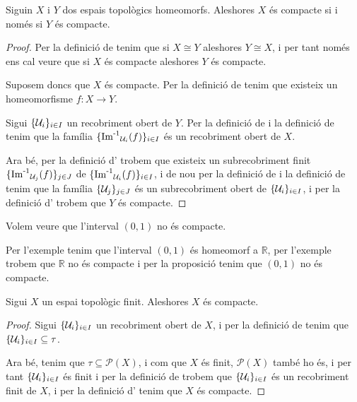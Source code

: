 \documentclass[../Apunts.tex]{subfiles}
\begin{document}
	\begin{proposition}
		\label{prop:la compacitat és una propietat topològica}
		Siguin \(X\) i \(Y\) dos espais topològics homeomorfs. Aleshores \(X\) és compacte si i només si \(Y\) és compacte.
		\begin{proof}
			Per la definició de  tenim que si \(X\cong Y\) aleshores \(Y\cong X\), i per tant només ens cal veure que si \(X\) és compacte aleshores \(Y\) és compacte.
			
			Suposem doncs que \(X\) és compacte. Per la definició de  tenim que existeix un homeomorfisme \(f\colon X\longrightarrow Y\).
			
			Sigui \(\{\mathcal{U}_{i}\}_{i\in I}\) un recobriment obert de \(Y\). Per la definició de  i la definició de  tenim que la família \(\{\operatorname{\operatorname{Im}^{-1}}_{\mathcal{U}_{i}}(f)\}_{i\in I}\) és un recobriment obert de \(X\).
			
			Ara bé, per la definició d' trobem que existeix un subrecobriment finit \(\{\operatorname{\operatorname{Im}^{-1}}_{\mathcal{U}_{j}}(f)\}_{j\in J}\) de \(\{\operatorname{\operatorname{Im}^{-1}}_{\mathcal{U}_{i}}(f)\}_{i\in I}\), i de nou per la definició de  i la definició de  tenim que la família \(\{\mathcal{U}_{j}\}_{j\in J}\) és un subrecobriment obert de \(\{\mathcal{U}_{i}\}_{i\in I}\), i per la definició d' trobem que \(Y\) és compacte.
		\end{proof}
	\end{proposition}
	\begin{example}
		\label{ex:l'interval (0,1) no és compacte}
		Volem veure que l'interval \((0,1)\) no és compacte.
		\begin{solution}
			Per l'exemple  tenim que l'interval \((0,1)\) és homeomorf a \(\mathbb{R}\), per l'exemple  trobem que \(\mathbb{R}\) no és compacte i per la proposició  tenim que \((0,1)\) no és compacte.
		\end{solution}
	\end{example}
	\begin{proposition}
		\label{prop:un espai topològic finit és compacte}
		Sigui \(X\) un espai topològic finit. Aleshores \(X\) és compacte.
		\begin{proof}
			Sigui \(\{\mathcal{U}_{i}\}_{i\in I}\) un recobriment obert de \(X\), i per la definició de  tenim que \(\{\mathcal{U}_{i}\}_{i\in I}\subseteq\tau\).
			
			Ara bé, tenim que \(\tau\subseteq\mathcal{P}(X)\), i com que \(X\) és finit, \(\mathcal{P}(X)\) també ho és, i per tant \(\{\mathcal{U}_{i}\}_{i\in I}\) és finit i per la definició de  trobem que \(\{\mathcal{U}_{i}\}_{i\in I}\) és un recobriment finit de \(X\), i per la definició d' tenim que \(X\) és compacte.
		\end{proof}
	\end{proposition}
\end{document}

